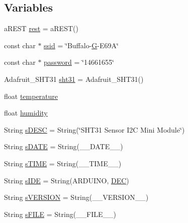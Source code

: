 \subsection*{Variables}
\begin{DoxyCompactItemize}
\item 
a\-R\-E\-S\-T \hyperlink{ESP8266__SHT31__WiFi__REST_8ino_a26fae33ed4ee26417d9384858ac417f7}{rest} = a\-R\-E\-S\-T()
\item 
const char $\ast$ \hyperlink{ESP8266__SHT31__WiFi__REST_8ino_a587ba0cb07f02913598610049a3bbb79}{ssid} = \char`\"{}Buffalo-\/\hyperlink{OWGeneric__SensorStation_8ino_a0b5841fe91d5a3db72753b6217923030}{G}-\/E69\-A\char`\"{}
\item 
const char $\ast$ \hyperlink{ESP8266__SHT31__WiFi__REST_8ino_aa4a2ebcb494493f648ae1e6975672575}{password} = \char`\"{}14661655\char`\"{}
\item 
Adafruit\-\_\-\-S\-H\-T31 \hyperlink{ESP8266__SHT31__WiFi__REST_8ino_a4cc868f67bc519384a9e92cd96d408c9}{sht31} = Adafruit\-\_\-\-S\-H\-T31()
\item 
float \hyperlink{ESP8266__SHT31__WiFi__REST_8ino_afc1d28cfbce795d6ea954ebe725241f5}{temperature}
\item 
float \hyperlink{ESP8266__SHT31__WiFi__REST_8ino_a6a87b2b0cff24d38b367ccd34843a206}{humidity}
\item 
String \hyperlink{ESP8266__SHT31__WiFi__REST_8ino_ae8232eda1714a9bd2e5da8ded2b0c365}{s\-D\-E\-S\-C} = String(\char`\"{}S\-H\-T31 Sensor I2\-C Mini Module\char`\"{})
\item 
String \hyperlink{ESP8266__SHT31__WiFi__REST_8ino_ab0eda3a14fb41a010beea28578b713ee}{s\-D\-A\-T\-E} = String(\-\_\-\-\_\-\-D\-A\-T\-E\-\_\-\-\_\-)
\item 
String \hyperlink{ESP8266__SHT31__WiFi__REST_8ino_aae95a988bed97dcf06125d816b0378e6}{s\-T\-I\-M\-E} = String(\-\_\-\-\_\-\-T\-I\-M\-E\-\_\-\-\_\-)
\item 
String \hyperlink{ESP8266__SHT31__WiFi__REST_8ino_a237040e243e5e70e2ff9ff6c16c4364f}{s\-I\-D\-E} = String(A\-R\-D\-U\-I\-N\-O, \hyperlink{Print_8h_afe38ec6126e35e40049e27fdf4586ba5}{D\-E\-C})
\item 
String \hyperlink{ESP8266__SHT31__WiFi__REST_8ino_a4dc4702d8b6169db32029731da0ba8a0}{s\-V\-E\-R\-S\-I\-O\-N} = String(\-\_\-\-\_\-\-V\-E\-R\-S\-I\-O\-N\-\_\-\-\_\-)
\item 
String \hyperlink{ESP8266__SHT31__WiFi__REST_8ino_a904bb91a335ed78bb595b14dfed03182}{s\-F\-I\-L\-E} = String(\-\_\-\-\_\-\-F\-I\-L\-E\-\_\-\-\_\-)
\end{DoxyCompactItemize}



